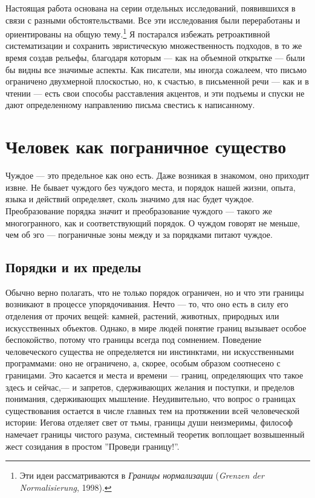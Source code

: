 \documentclass[12pt]{book}
\begin{document}
Настоящая работа основана на серии отдельных исследований, появившихся в связи с разными обстоятельствами. Все эти исследования были переработаны и ориентированы на общую тему.\footnote{Эти идеи рассматриваются в \textit{Границы нормализации} (\textit{Grenzen der Normalisierung}, 1998).} Я постарался избежать ретроактивной систематизации и сохранить эвристическую множественность подходов, в то же время создав рельефы, благодаря которым --- как на объемной открытке --- были бы видны все значимые аспекты. Как писатели, мы иногда сожалеем, что письмо ограничено двухмерной плоскостью, но, к счастью, в письменной речи --- как и в чтении --- есть свои способы расставления акцентов, и эти подъемы и спуски не дают определенному направлению письма свестись к написанному.

\chapter{Человек как пограничное существо}

Чуждое --- это предельное как оно есть. Даже возникая в знакомом, оно приходит извне. Не бывает чуждого без чуждого места, и порядок нашей жизни, опыта, языка и действий определяет, сколь значимо для нас будет чуждое. Преобразование порядка значит и преобразование чуждого --- такого же многогранного, как и соответствующий порядок. О чуждом говорят не меньше, чем об эго --- пограничные зоны между и за порядками питают чуждое.

\section{Порядки и их пределы}

Обычно верно полагать, что не только порядок ограничен, но и что эти границы возникают в процессе упорядочивания. Нечто --- то, что оно есть в силу его отделения от прочих вещей: камней, растений, животных, природных или искусственных объектов. Однако, в мире людей понятие границ вызывает особое беспокойство, потому что границы всегда под сомнением. Поведение человеческого существа не определяется ни инстинктами, ни искусственными программами: оно не ограничено, а, скорее, особым образом соотнесено с границами. Это касается и места и времени --- границ, определяющих что такое здесь и сейчас,--- и запретов, сдерживающих желания и поступки, и пределов понимания, сдерживающих мышление. Неудивительно, что вопрос о границах существования остается в числе главных тем на протяжении всей человеческой истории: Иегова отделяет свет от тьмы, границы души неизмеримы, философ намечает границы чистого разума, системный теоретик воплощает возвышенный жест созидания в простом ''Проведи границу!''.
\end{document}
